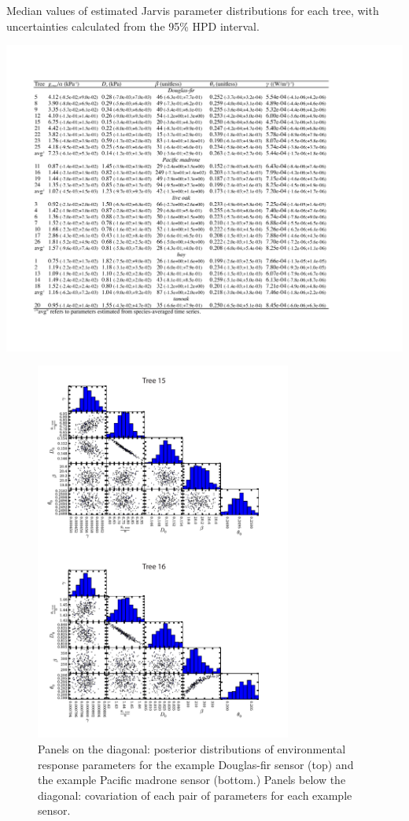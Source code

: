 \begin{table}
  \caption{Median values of estimated Jarvis parameter distributions for each tree, with uncertainties calculated from the 
95\% HPD interval.}
  \label{tbl:sapflow_mcmc}
  \includegraphics[width=\linewidth]{ch1-sapflow/tables/TableA2_cropped.pdf}
\end{table}

\begin{figure}[here]
\includegraphics[width=0.75\textwidth]{ch1-sapflow/figures/FigureA1.pdf}
\caption{Panels on the diagonal: posterior distributions of environmental response parameters for the example Douglas-fir sensor (top) and the example Pacific madrone sensor (bottom.)  Panels below the diagonal: covariation of each pair of parameters for each example sensor.}
\label{fig:sapflow_posterior}
\end{figure}

